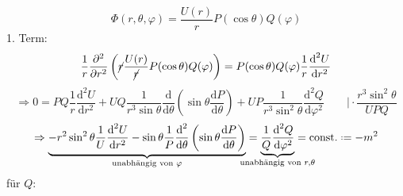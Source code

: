 \documentclass[titlepage,11pt,a4paper,ngerman]{report}
\newcommand*{\defeq}{\mathrel{\vcenter{\baselineskip0.5ex \lineskiplimit0pt \hbox{\scriptsize.}\hbox{\scriptsize.}}}=}
\newcommand{\tx}[1]{\textrm{#1}}
\newcommand{\const}{\tx{const.}}
\newcommand{\prt}[2]{\frac{\partial #1}{\partial #2}}
\renewcommand{\Phi}{\varPhi}
\begin{document}
$$\Phi(r,\theta,\varphi) = \frac{U(r)}{r} P(\cos\theta)Q(\varphi)$$
1. Term:
$$\frac{1}{r} \prt{^2}{r^2} \left(\cancel{r} \frac{U(r)}{\cancel{r}} P(\cos\theta)Q(\varphi)\right) = P(\cos\theta)Q(\varphi)\frac{1}{r}\frac{\textrm{d}^2 U}{\textrm{d} r^2}$$
$$\Rightarrow 0 = PQ \frac{1}{r} \frac{\textrm{d}^2 U}{\textrm{d} r^2} + UQ \frac{1}{r^3 \sin \theta}\frac{\textrm{d}}{\textrm{d}\theta} \left(\sin\theta \frac{\textrm{d} P}{\textrm{d} \theta} \right) + UP \frac{1}{r^3 \sin^2 \theta} \frac{\textrm{d}^2 Q}{\textrm{d} \varphi^2} \qquad \bigg\rvert \cdot \frac{r^3 \sin^2 \theta}{UPQ}$$
$$\Rightarrow \underbrace{- r^2 \sin^2 \theta \frac{1}{U} \frac{\textrm{d}^2 U}{\textrm{d} r^2} - \sin \theta \frac{1}{P}\frac{\textrm{d}^2}{\textrm{d} \theta}\left( \sin \theta \frac{\textrm{d} P}{\textrm{d} \theta} \right)}_{\textrm{unabhängig von } \varphi} = \underbrace{\frac{1}{Q} \frac{\textrm{d}^2 Q}{\textrm{d} \varphi^2}}_{\mathclap{\textrm{unabhängig von }r,\theta}} = \const \defeq -m^2$$
für $Q$:
\end{document}
